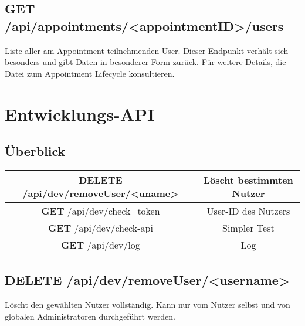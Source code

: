 \documentclass[11pt,a4paper]{article}
\begin{document}
\subsection{\textbf{GET} /api/appointments/<appointmentID>/users}
Liste aller am Appointment teilnehmenden User. 
Dieser Endpunkt verhält sich besonders und gibt Daten in besonderer Form zurück. 
Für weitere Details, die Datei zum Appointment Lifecycle konsultieren.

\section{Entwicklungs-API}
\subsection{Überblick}

\begin{tabular}{|c|c|}
\hline
\textbf{DELETE} /api/dev/removeUser/<uname> & Löscht bestimmten Nutzer \\
\hline
\textbf{GET} /api/dev/check\_token & User-ID des Nutzers \\
\hline
\textbf{GET} /api/dev/check-api & Simpler Test \\
\hline
\textbf{GET} /api/dev/log & Log \\
\hline
\end{tabular}

\subsection{\textbf{DELETE} /api/dev/removeUser/<username>}
Löscht den gewählten Nutzer vollständig. Kann nur vom Nutzer selbst und von globalen Administratoren durchgeführt werden.
\end{document}
